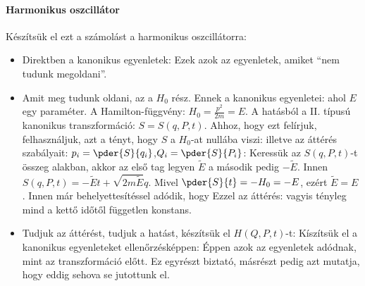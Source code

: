    \paragraph{Harmonikus oszcillátor}
    
    Készítsük el ezt a számolást a harmonikus oszcillátorra:
    \begin{itemize}
     \item Direktben a kanonikus egyenletek:
      Ezek azok az egyenletek, amiket ``nem tudunk megoldani''.
     \item Amit meg tudunk oldani, az a $H_0$ rész.
   Ennek a kanonikus egyenletei:
      ahol $E$ egy paraméter.
   A Hamilton-függvény: $H_0=\frac{p^2}{2m}=E$.
   A hatásból a II. típusú kanonikus transzformáció: $S=S(q,P,t)$.
   Ahhoz, hogy ezt felírjuk, felhasználjuk, azt a tényt, hogy $S$ a $H_0$-at nullába viszi:
      illetve az áttérés szabályait: $p_i=\pder{S}{q_i}$,$Q_i=\pder{S}{P_i}$:
      Keressük az $S(q,P,t)$-t összeg alakban, akkor az első tag legyen $\tilde E$ a második pedig $-\tilde E$.
   Innen $S(q,P,t)=-\tilde{E}t+\sqrt{2m\tilde{E}}q$.
   Mivel $\pder{S}{t}=-H_0=-E$, ezért $\tilde{E}=E$.
   Innen már behelyettesítéssel adódik, hogy 
      Ezzel az áttérés:
      vagyis tényleg mind a kettő időtől független konstans. 
      
     \item Tudjuk az áttérést, tudjuk a hatást, készítsük el $H(Q,P,t)$-t:
      Kíszítsük el a kanonikus egyenleteket ellenőrzésképpen:
      Éppen azok az egyenletek adódnak, mint az transzformáció előtt.
   Ez egyrészt biztató, másrészt pedig azt mutatja, hogy eddig sehova se jutottunk el. 
      

\end{itemize}
